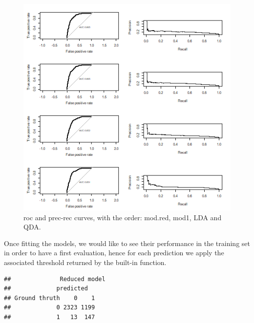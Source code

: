 \documentclass[
]{article}
\newenvironment{Shaded}{\begin{snugshade}}{\end{snugshade}}
\newcommand{\AttributeTok}[1]{\textcolor[rgb]{0.77,0.63,0.00}{#1}}
\newcommand{\DecValTok}[1]{\textcolor[rgb]{0.00,0.00,0.81}{#1}}
\newcommand{\FunctionTok}[1]{\textcolor[rgb]{0.00,0.00,0.00}{#1}}
\newcommand{\NormalTok}[1]{#1}
\newcommand{\OtherTok}[1]{\textcolor[rgb]{0.56,0.35,0.01}{#1}}
\newcommand{\SpecialCharTok}[1]{\textcolor[rgb]{0.00,0.00,0.00}{#1}}
\newcommand{\StringTok}[1]{\textcolor[rgb]{0.31,0.60,0.02}{#1}}
\begin{document}
\begin{figure}
\centering
\includegraphics{curves.png}
\caption{roc and prec-rec curves, with the order: mod.red, mod1, LDA and
QDA.}
\end{figure}

Once fitting the models, we would like to see their performance in the
training set in order to have a first evaluation, hence for each
prediction we apply the associated threshold returned by the built-in
function.

\begin{Shaded}
\end{Shaded}

\begin{verbatim}
##              Reduced model 
##             predicted
## Ground thruth    0    1
##             0 2323 1199
##             1   13  147
\end{verbatim}
\end{document}
